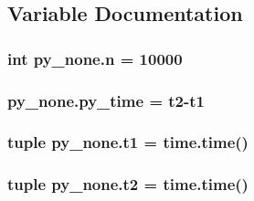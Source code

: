 \subsection{Variable Documentation}
\hypertarget{namespacepy__none_a004911175aac59da923ca0b4018e47c5}{}
\subsubsection[{n}]{\setlength{\rightskip}{0pt plus 5cm}int py\+\_\+none.\+n = 10000}\label{namespacepy__none_a004911175aac59da923ca0b4018e47c5}
\hypertarget{namespacepy__none_a57377520ba2c328d51d91ac1b7eff563}{}
\subsubsection[{py\+\_\+time}]{\setlength{\rightskip}{0pt plus 5cm}py\+\_\+none.\+py\+\_\+time = {\bf t2}-\/{\bf t1}}\label{namespacepy__none_a57377520ba2c328d51d91ac1b7eff563}
\hypertarget{namespacepy__none_a98c6499cb662bb7f8f2c501e28c8719d}{}
\subsubsection[{t1}]{\setlength{\rightskip}{0pt plus 5cm}tuple py\+\_\+none.\+t1 = time.\+time()}\label{namespacepy__none_a98c6499cb662bb7f8f2c501e28c8719d}
\hypertarget{namespacepy__none_a4e7d066126886bc5af2819f65e1c27ae}{}
\subsubsection[{t2}]{\setlength{\rightskip}{0pt plus 5cm}tuple py\+\_\+none.\+t2 = time.\+time()}\label{namespacepy__none_a4e7d066126886bc5af2819f65e1c27ae}
